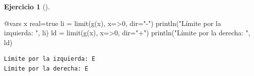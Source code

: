 \documentclass[
  a4paper,
]{scrreport}
\newenvironment{Shaded}{\begin{snugshade}}{\end{snugshade}}
\newcommand{\ConstantTok}[1]{\textcolor[rgb]{0.56,0.35,0.01}{#1}}
\newcommand{\FloatTok}[1]{\textcolor[rgb]{0.68,0.00,0.00}{#1}}
\newcommand{\FunctionTok}[1]{\textcolor[rgb]{0.28,0.35,0.67}{#1}}
\newcommand{\NormalTok}[1]{\textcolor[rgb]{0.00,0.23,0.31}{#1}}
\newcommand{\OperatorTok}[1]{\textcolor[rgb]{0.37,0.37,0.37}{#1}}
\newcommand{\PreprocessorTok}[1]{\textcolor[rgb]{0.68,0.00,0.00}{#1}}
\newcommand{\StringTok}[1]{\textcolor[rgb]{0.13,0.47,0.30}{#1}}
\theoremstyle{definition}
\newtheorem{exercise}{Ejercicio}[chapter]
\theoremstyle{remark}
\begin{document}
\begin{exercise}[]
\begin{tcolorbox}
\begin{Shaded}
\begin{Highlighting}[]
\PreprocessorTok{@vars}\NormalTok{ x real}\OperatorTok{=}\ConstantTok{true}
\NormalTok{li }\OperatorTok{=} \FunctionTok{limit}\NormalTok{(}\FunctionTok{g}\NormalTok{(x), x}\OperatorTok{=\textgreater{}}\FloatTok{0}\NormalTok{, dir}\OperatorTok{=}\StringTok{"{-}"}\NormalTok{)}
\FunctionTok{println}\NormalTok{(}\StringTok{"Límite por la izquierda: "}\NormalTok{, li)}
\NormalTok{ld }\OperatorTok{=} \FunctionTok{limit}\NormalTok{(}\FunctionTok{g}\NormalTok{(x), x}\OperatorTok{=\textgreater{}}\FloatTok{0}\NormalTok{, dir}\OperatorTok{=}\StringTok{"+"}\NormalTok{)}
\FunctionTok{println}\NormalTok{(}\StringTok{"Límite por la derecha: "}\NormalTok{, ld)}
\end{Highlighting}
\end{Shaded}

\begin{verbatim}
Límite por la izquierda: E
Límite por la derecha: E
\end{verbatim}

\end{tcolorbox}

\end{exercise}
\end{document}
